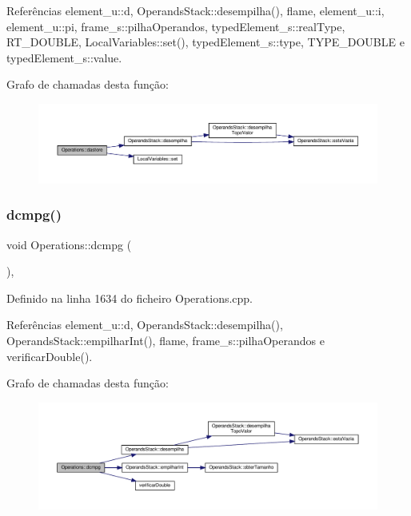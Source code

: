 Referências element\+\_\+u\+::d, Operands\+Stack\+::desempilha(), flame, element\+\_\+u\+::i, element\+\_\+u\+::pi, frame\+\_\+s\+::pilha\+Operandos, typed\+Element\+\_\+s\+::real\+Type, R\+T\+\_\+\+D\+O\+U\+B\+LE, Local\+Variables\+::set(), typed\+Element\+\_\+s\+::type, T\+Y\+P\+E\+\_\+\+D\+O\+U\+B\+LE e typed\+Element\+\_\+s\+::value.

Grafo de chamadas desta função\+:
\nopagebreak
\begin{figure}[H]
\begin{center}
\leavevmode
\includegraphics[width=350pt]{classOperations_a9735fdb8ba4ea2d7b8b32e8d0a5d2f72_cgraph}
\end{center}
\end{figure}
\mbox{\label{classOperations_a7c2a5194de7a2a59ada752001b8ece0a}} 
\subsubsection{\texorpdfstring{dcmpg()}{dcmpg()}}
{\footnotesize\ttfamily void Operations\+::dcmpg (\begin{DoxyParamCaption}{ }\end{DoxyParamCaption})\hspace{0.3cm}{\ttfamily [static]}, {\ttfamily [private]}}



Definido na linha 1634 do ficheiro Operations.\+cpp.



Referências element\+\_\+u\+::d, Operands\+Stack\+::desempilha(), Operands\+Stack\+::empilhar\+Int(), flame, frame\+\_\+s\+::pilha\+Operandos e verificar\+Double().

Grafo de chamadas desta função\+:
\nopagebreak
\begin{figure}[H]
\begin{center}
\leavevmode
\includegraphics[width=350pt]{classOperations_a7c2a5194de7a2a59ada752001b8ece0a_cgraph}
\end{center}
\end{figure}
\mbox{\label{classOperations_a89e1792d8c650c2274352c534cfbd7c0}} 
